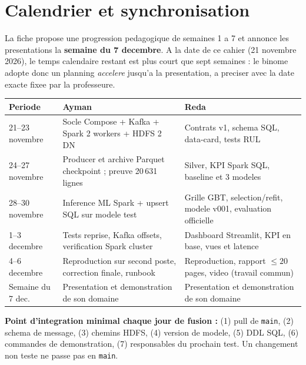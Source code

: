\documentclass[10pt,a4paper]{article}
\newcommand{\code}[1]{{\small\ttfamily\nolinkurl{#1}}}
\begin{document}
\section{Calendrier et synchronisation}
La fiche propose une progression pedagogique de semaines 1 a 7 et annonce les presentations la \textbf{semaine du 7 decembre}. A la date de ce cahier (21 novembre 2026), le temps calendaire restant est plus court que sept semaines : le binome adopte donc un planning \emph{accelere} jusqu'a la presentation, a preciser avec la date exacte fixee par la professeure.
\begin{longtable}{@{}p{29mm}p{55mm}p{64mm}@{}}
\toprule
\textbf{Periode} & \textbf{Ayman} & \textbf{Reda}\\\midrule
\endhead
21--23 novembre & Socle Compose + Kafka + Spark 2 workers + HDFS 2 DN & Contrats v1, schema SQL, data-card, tests RUL\\
24--27 novembre & Producer et archive Parquet checkpoint ; preuve 20\,631 lignes & Silver, KPI Spark SQL, baseline et 3 modeles\\
28--30 novembre & Inference ML Spark + upsert SQL sur modele test & Grille GBT, selection/refit, modele v001, evaluation officielle\\
1--3 decembre & Tests reprise, Kafka offsets, verification Spark cluster & Dashboard Streamlit, KPI en base, vues et latence\\
4--6 decembre & Reproduction sur second poste, correction finale, runbook & Reproduction, rapport \(\le20\) pages, video (travail commun)\\
Semaine du 7 dec. & Presentation et demonstration de son domaine & Presentation et demonstration de son domaine\\
\bottomrule
\end{longtable}
\textbf{Point d'integration minimal chaque jour de fusion :} (1) pull de \code{main}, (2) schema de message, (3) chemins HDFS, (4) version de modele, (5) DDL SQL, (6) commandes de demonstration, (7) responsables du prochain test. Un changement non teste ne passe pas en \code{main}.
\end{document}
